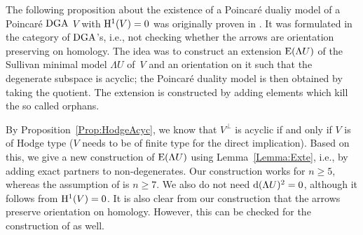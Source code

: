 \documentclass[\MainFolder/Text.tex]{subfiles}
\begin{document}
The following proposition about the existence of a Poincar\'e dualiy model of a Poincar\'e $\mathrm{DGA}$ $V$ with $\mathrm{H}^1(V)=0$ was originally proven in \cite[Theorem~1.1]{Lambrechts2007}.
It was formulated in the category of $\mathrm{DGA}$'s, i.e., not checking whether the arrows are orientation preserving on homology.
The idea was to construct an extension $\mathrm{E}(\Lambda U )$ of the Sullivan minimal model $\Lambda U$ of~$V$ and an orientation on it such that the degenerate subspace is acyclic; the Poincar\'e duality model is then obtained by taking the quotient.
The extension is constructed by adding elements which kill the so called orphans.

By Proposition~\ref{Prop:HodgeAcyc}, we know that $V^\perp$ is acyclic if and only if $V$ is of Hodge type ($V$ needs to be of finite type for the direct implication).
Based on this, we give a new construction of $\mathrm{E}(\Lambda U)$ using Lemma~\ref{Lemma:Exte}, i.e., by adding exact partners to non-degenerates.
Our construction works for $n\ge 5$, whereas the assumption of \cite{Lambrechts2007} is $n\ge 7$.
We also do not need $\mathrm{d} (\Lambda U)^2 = 0$, although it follows from $\mathrm{H}^1(V) = 0$.
It is also clear from our construction that the arrows preserve orientation on homology.
However, this can be checked for the construction of \cite{Lambrechts2007} as well.
\end{document}
